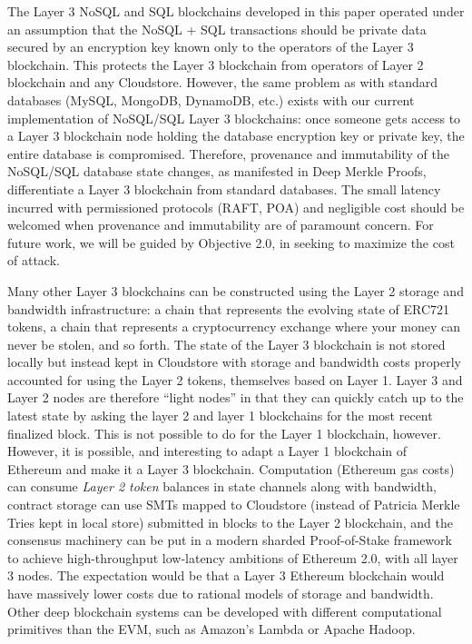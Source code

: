 \documentclass{article}
\begin{document}
The Layer 3 NoSQL and SQL blockchains developed in this paper operated under an assumption that the NoSQL + SQL transactions should be private data secured by an encryption key known only to the operators of the Layer 3 blockchain.   This protects the Layer 3 blockchain from operators of Layer 2 blockchain and any Cloudstore.  However, the same problem as with standard databases (MySQL, MongoDB, DynamoDB, etc.) exists with our current implementation of NoSQL/SQL Layer 3 blockchains: once someone gets access to a Layer 3 blockchain node holding the database encryption key or private key, the entire database is compromised. Therefore, provenance and immutability of the NoSQL/SQL database state changes, as manifested in Deep Merkle Proofs, differentiate a Layer 3 blockchain from standard databases. The small latency incurred with permissioned protocols (RAFT, POA) and negligible cost should be welcomed when provenance and immutability are of paramount concern.  For future work, we will be guided by Objective 2.0, in seeking to maximize the cost of attack.  

Many other Layer 3 blockchains can be constructed using the Layer 2 storage and bandwidth infrastructure: a chain that represents the evolving state of ERC721 tokens, a chain that represents a cryptocurrency exchange where your money can never be stolen, and so forth.  The state of the Layer 3 blockchain is not stored locally but instead kept in Cloudstore with storage and bandwidth costs properly accounted for using the Layer 2 tokens, themselves based on Layer 1.  Layer 3 and Layer 2 nodes are therefore ``light nodes'' in that they can quickly catch up to the latest state by asking the layer 2 and layer 1 blockchains for the most recent finalized block.  This is not possible to do for the Layer 1 blockchain, however.  However, it is possible, and interesting to adapt a Layer 1 blockchain of Ethereum and make it a Layer 3 blockchain.  Computation (Ethereum gas costs) can consume {\em Layer 2 token} balances in state channels along with bandwidth, contract storage can use SMTs mapped to Cloudstore (instead of Patricia Merkle Tries kept in local store) submitted in blocks to the Layer 2 blockchain, and the consensus machinery can be put in a modern sharded Proof-of-Stake framework to achieve high-throughput low-latency ambitions of Ethereum 2.0, with all layer 3 nodes.  The expectation would be that a Layer 3 Ethereum blockchain would have massively lower costs due to rational models of storage and bandwidth.   Other deep blockchain systems can be developed with different computational primitives than the EVM, such as Amazon's Lambda or Apache Hadoop.
\end{document}
